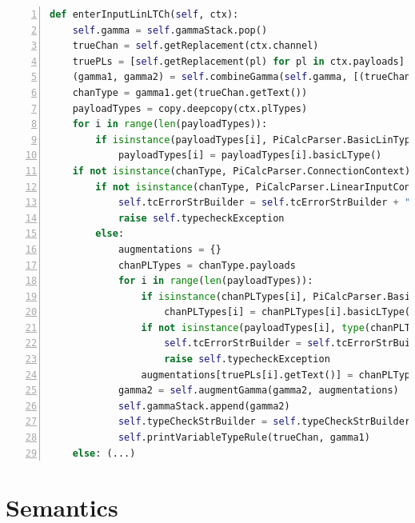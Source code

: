 \documentclass{l4proj}
\begin{document}
\begin{lstlisting}[language=Python, float=p, caption={\texttt{enterInputLinLTCh}, the function used to typecheck a linear-typed input process. This function works similiarly to \texttt{enterInputSesSTCh}, detailed in Listing \ref{lst:sTChCode}. The main differences are the use of \texttt{self.combineGamma} instead of \texttt{self.splitGamma} and the handling of multiple payloads. The final \texttt{else} clause has again been omitted for brevity and similarity to lines 16-29.}, label={lst:lTChCode}, extendedchars=True, numbers=left]
def enterInputLinLTCh(self, ctx):
	self.gamma = self.gammaStack.pop()
	trueChan = self.getReplacement(ctx.channel)
	truePLs = [self.getReplacement(pl) for pl in ctx.payloads]
	(gamma1, gamma2) = self.combineGamma(self.gamma, [(trueChan.getText(), "Input")])
	chanType = gamma1.get(trueChan.getText())
	payloadTypes = copy.deepcopy(ctx.plTypes)
	for i in range(len(payloadTypes)):
		if isinstance(payloadTypes[i], PiCalcParser.BasicLinTypeContext):
			payloadTypes[i] = payloadTypes[i].basicLType()
	if not isinstance(chanType, PiCalcParser.ConnectionContext):
		if not isinstance(chanType, PiCalcParser.LinearInputContext):
			self.tcErrorStrBuilder = self.tcErrorStrBuilder + "<span class='error'>ERROR: Typechecking rule T(*@$\pi$@*)-Inp failed due to " + trueChan.getText() + ". Input process on channel not of input type.</span>\n"
			raise self.typecheckException
		else:
			augmentations = {}
			chanPLTypes = chanType.payloads
			for i in range(len(payloadTypes)):
				if isinstance(chanPLTypes[i], PiCalcParser.BasicLinTypeContext):
					chanPLTypes[i] = chanPLTypes[i].basicLType()
				if not isinstance(payloadTypes[i], type(chanPLTypes[i])):
					self.tcErrorStrBuilder = self.tcErrorStrBuilder + "<span class='error'>ERROR: Typechecking rule T(*@$\pi$@*)-Inp failed due to " + truePLs[i].getText() + ". Input process payload has type annotation that does not match channel type.</span>\n"
					raise self.typecheckException
				augmentations[truePLs[i].getText()] = chanPLTypes[i]
			gamma2 = self.augmentGamma(gamma2, augmentations)
			self.gammaStack.append(gamma2)
			self.typeCheckStrBuilder = self.typeCheckStrBuilder.replace(u"(*@$\square$@*)", u"(*@$\square\triangle$@*)T(*@$\pi$@*)-Inp(*@$\triangle\square$@*)", 1)
			self.printVariableTypeRule(trueChan, gamma1)
	else: (...)
\end{lstlisting}

\newpage

\section{Semantics}
\label{implSem}
\end{document}
